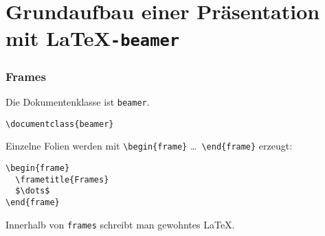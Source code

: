 
\section{Grundaufbau einer Präsentation mit \LaTeX\texttt{-beamer}}


\newenvironment{slide}
  {\begin{frame}[fragile,environment=slide]}
  {\end{frame}}


\begin{slide}
  \frametitle{Frames}

  \onslide<+->
  Die Dokumentenklasse ist \lstinline|beamer|.
\begin{lstlisting}
\documentclass{beamer}
\end{lstlisting}
  \onslide<+->

  Einzelne Folien werden mit \lstinline!\begin{frame}! \dots \lstinline! \end{frame}!
  erzeugt:
\begin{lstlisting}
\begin{frame}
  \frametitle{Frames}
  $\dots$
\end{frame}
\end{lstlisting}


  Innerhalb von \lstinline|frames| schreibt man gewohntes \LaTeX.

\end{slide}

